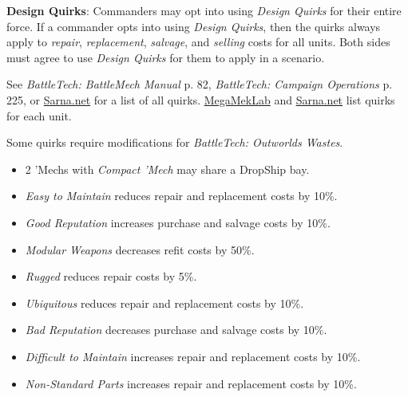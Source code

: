 \item {\bfseries Design Quirks}: Commanders may opt into using \emph{Design Quirks} for their entire force.
If a commander opts into using \emph{Design Quirks}, then the quirks always apply to \emph{repair}, \emph{replacement}, \emph{salvage}, and \emph{selling} costs for all units.
Both sides must agree to use \emph{Design Quirks} for them to apply in a scenario.

See \emph{BattleTech: BattleMech Manual} p. 82, \emph{BattleTech: Campaign Operations} p. 225, or \href{https://sarna.net}{Sarna.net} for a list of all quirks.
\href{https://megamek.org}{MegaMekLab} and \href{https://sarna.net}{Sarna.net} list quirks for each unit.

Some quirks require modifications for \emph{BattleTech: Outworlds Wastes}.

\begin{itemize}

\item 2 'Mechs with \emph{Compact 'Mech} may share a DropShip bay.

\item \emph{Easy to Maintain} reduces repair and replacement costs by 10\%.

\item \emph{Good Reputation} increases purchase and salvage costs by 10\%.

\item \emph{Modular Weapons} decreases refit costs by 50\%.

\item \emph{Rugged} reduces repair costs by 5\%.

\item \emph{Ubiquitous} reduces repair and replacement costs by 10\%.

\item \emph{Bad Reputation} decreases purchase and salvage costs by 10\%.

\item \emph{Difficult to Maintain} increases repair and replacement costs by 10\%.

\item \emph{Non-Standard Parts} increases repair and replacement costs by 10\%.

\end{itemize}
